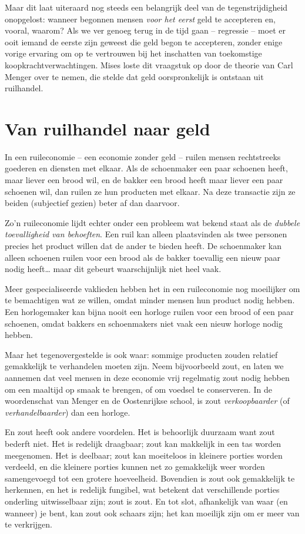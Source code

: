 \documentclass[
  a5paper,
  smalldemyvopaper,11pt,twoside,onecolumn,openright,extrafontsizes,
hidelinks]{memoir}
\begin{document}
Maar dit laat uiteraard nog steeds een belangrijk deel van de
tegenstrijdigheid onopgelost: wanneer begonnen mensen \emph{voor het
eerst} geld te accepteren en, vooral, waarom? Als we ver genoeg terug in
de tijd gaan -- regressie -- moet er ooit iemand de eerste zijn geweest
die geld begon te accepteren, zonder enige vorige ervaring om op te
vertrouwen bij het inschatten van toekomstige koopkrachtverwachtingen. Mises loste dit vraagstuk op door de theorie van Carl Menger over te
nemen, die stelde dat geld oorspronkelijk is ontstaan uit ruilhandel.

\section{Van ruilhandel naar geld}\label{van-ruilhandel-naar-geld}

In een ruileconomie -- een economie zonder geld -- ruilen mensen
rechtstreeks goederen en diensten met elkaar. Als de schoenmaker een
paar schoenen heeft, maar liever een brood wil, en de bakker een brood
heeft maar liever een paar schoenen wil, dan ruilen ze hun producten met
elkaar. Na deze transactie zijn ze beiden (subjectief gezien) beter af
dan daarvoor.

Zo'n ruileconomie lijdt echter onder een probleem wat bekend staat als
de \emph{dubbele toevalligheid van behoeften}. Een ruil kan alleen
plaatsvinden als twee personen precies het product willen dat de ander
te bieden heeft. De schoenmaker kan alleen schoenen ruilen voor een
brood als de bakker toevallig een nieuw paar nodig heeft\ldots{} maar
dit gebeurt waarschijnlijk niet heel vaak.

Meer gespecialiseerde vaklieden hebben het in een ruileconomie nog
moeilijker om te bemachtigen wat ze willen, omdat minder mensen hun
product nodig hebben. Een horlogemaker kan bijna nooit een horloge
ruilen voor een brood of een paar schoenen, omdat bakkers en
schoenmakers niet vaak een nieuw horloge nodig hebben.

Maar het tegenovergestelde is ook waar: sommige producten zouden
relatief gemakkelijk te verhandelen moeten zijn. Neem bijvoorbeeld zout,
en laten we aannemen dat veel mensen in deze economie vrij regelmatig
zout nodig hebben om een maaltijd op smaak te brengen, of om voedsel te
conserveren. In de woordenschat van Menger en de Oostenrijkse school, is
zout \emph{verkoopbaarder} (of \emph{verhandelbaarder}) dan een horloge.

En zout heeft ook andere voordelen. Het is behoorlijk duurzaam want zout
bederft niet. Het is redelijk draagbaar; zout kan makkelijk in een tas
worden meegenomen. Het is deelbaar; zout kan moeiteloos in kleinere
porties worden verdeeld, en die kleinere porties kunnen net zo
gemakkelijk weer worden samengevoegd tot een grotere hoeveelheid.
Bovendien is zout ook gemakkelijk te herkennen, en het is redelijk
fungibel, wat betekent dat verschillende porties onderling uitwisselbaar
zijn; zout is zout. En tot slot, afhankelijk van waar (en wanneer) je
bent, kan zout ook schaars zijn; het kan moeilijk zijn om er meer van te
verkrijgen.
\end{document}
